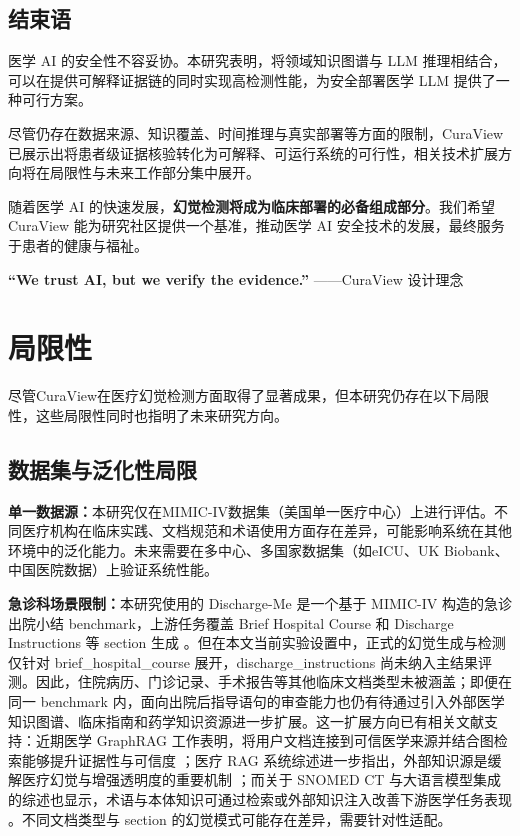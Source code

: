 \documentclass[11pt]{article}
\begin{document}
\subsection{结束语}

医学 AI 的安全性不容妥协。本研究表明，将领域知识图谱与 LLM 推理相结合，可以在提供可解释证据链的同时实现高检测性能，为安全部署医学 LLM 提供了一种可行方案。

尽管仍存在数据来源、知识覆盖、时间推理与真实部署等方面的限制，CuraView 已展示出将患者级证据核验转化为可解释、可运行系统的可行性，相关技术扩展方向将在局限性与未来工作部分集中展开。

随着医学 AI 的快速发展，\textbf{幻觉检测将成为临床部署的必备组成部分}。我们希望 CuraView 能为研究社区提供一个基准，推动医学 AI 安全技术的发展，最终服务于患者的健康与福祉。

\textbf{``We trust AI, but we verify the evidence.''} ------CuraView 设计理念

\section{局限性}
尽管CuraView在医疗幻觉检测方面取得了显著成果，但本研究仍存在以下局限性，这些局限性同时也指明了未来研究方向。

\subsection{数据集与泛化性局限}

\textbf{单一数据源：}本研究仅在MIMIC-IV数据集（美国单一医疗中心）上进行评估。不同医疗机构在临床实践、文档规范和术语使用方面存在差异，可能影响系统在其他环境中的泛化能力。未来需要在多中心、多国家数据集（如eICU、UK Biobank、中国医院数据）上验证系统性能。

\textbf{急诊科场景限制：}本研究使用的 Discharge-Me 是一个基于 MIMIC-IV 构造的急诊出院小结 benchmark，上游任务覆盖 Brief Hospital Course 和 Discharge Instructions 等 section 生成 \citep{stanfordaimi2024dischargeMe,xu2024dischargeMeSharedTask}。但在本文当前实验设置中，正式的幻觉生成与检测仅针对 brief\_hospital\_course 展开，discharge\_instructions 尚未纳入主结果评测。因此，住院病历、门诊记录、手术报告等其他临床文档类型未被涵盖；即便在同一 benchmark 内，面向出院后指导语句的审查能力也仍有待通过引入外部医学知识图谱、临床指南和药学知识资源进一步扩展。这一扩展方向已有相关文献支持：近期医学 GraphRAG 工作表明，将用户文档连接到可信医学来源并结合图检索能够提升证据性与可信度 \citep{wu2025medicalGraphRAG}；医疗 RAG 系统综述进一步指出，外部知识源是缓解医疗幻觉与增强透明度的重要机制 \citep{amugongo2025healthcareRAGReview}；而关于 SNOMED CT 与大语言模型集成的综述也显示，术语与本体知识可通过检索或外部知识注入改善下游医学任务表现 \citep{chang2024snomedCtLLM}。不同文档类型与 section 的幻觉模式可能存在差异，需要针对性适配。
\end{document}
